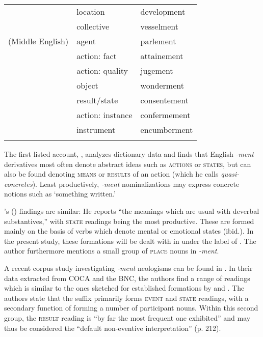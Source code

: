 \begin{table}
\begin{tabular}{lll}
        & location & {development} \\
        \citet{Lloyd.2011}  & collective    & {vesselment} \\
        (Middle English)  & agent       & {parlement} \\
        & action: fact    & {attainement} \\
        & action: quality & {jugement}\\
        & object      & {wonderment} \\
        & result/state    & {consentement} \\
        & action: instance  & {confermement}\\
        & instrument    & {encumberment}\\               
        \lspbottomrule
      \end{tabular} 
  \end{table}

The first listed account, \citet[77--85]{Gadde.1910},  analyzes dictionary data and finds that English \textit{-ment} derivatives most often denote abstract ideas such as \textsc{actions} or \textsc{states}, but can also be found denoting \textsc{means} or \textsc{results} of an action (which he calls \textit{quasi-concretes}). Least productively, \textit{-ment} nominalizations may express concrete notions such as `something written.'

\citeauthor{Marchand.1969}'s (\citeyear[332]{Marchand.1969}) findings are similar: He reports ``the meanings which are usual with deverbal substantives,'' with \textsc{state} readings being the most productive. These are formed mainly on the basis of verbs which denote mental or emotional states (ibid.). In the present study, these formations will be dealt with in  under the label of . The author furthermore mentions a small group of \textsc{place} nouns in \textit{-ment}. 

A recent corpus study investigating \textit{-ment} neologisms can be found in \citet{Bauer.2013}. In their data extracted from \acs{COCA} and the \acs{BNC}, the authors find a range of readings which is similar to the ones sketched for established formations by \citet{Gadde.1910} and \citet{Marchand.1969}. The authors state that the suffix primarily forms \textsc{event} and \textsc{state} readings, with a secondary function of forming a number of participant nouns. Within this second group, the \textsc{result} reading is ``by far the most frequent one exhibited'' and may thus be considered the ``default non-eventive interpretation'' (p. 212).

